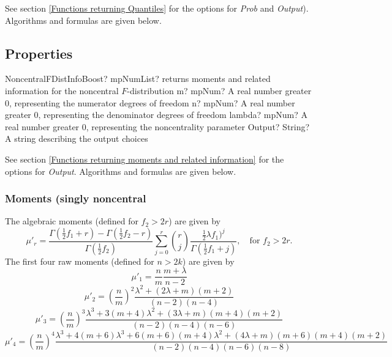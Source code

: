 See section \ref{Functions returning Quantiles} for the options for  {\itshape\sffamily Prob} and {\itshape\sffamily Output}). Algorithms and formulas are given below.




\subsection{Properties}


\begin{mpFunctionsExtract}
	\mpFunctionFour
	{NoncentralFDistInfoBoost? mpNumList? returns moments and related information for the noncentral $F$-distribution}
	{m? mpNum? A real number greater 0, representing the numerator  degrees of freedom}
	{n? mpNum? A real number greater 0, representing the denominator degrees of freedom}
	{lambda? mpNum? A real number greater 0, representing the noncentrality parameter}
	{Output? String? A string describing the output choices}
\end{mpFunctionsExtract}

\vspace{0.3cm}

See section \ref{Functions returning moments and related information} for the options for {\itshape\sffamily Output}. Algorithms and formulas are given below.


\subsubsection{Moments (singly noncentral}
The algebraic moments (defined for $f_2 > 2r$) are given by
\begin{equation}
	\mu'_r = \frac{\Gamma( \tfrac{1}{2}f_1+r)-\Gamma( \tfrac{1}{2}f_2-r)}{\Gamma( \tfrac{1}{2}f_2)} \sum_{j=0}^{r} { \binom{r}{j} \frac{\tfrac{1}{2}\lambda f_1)^j} {\Gamma( \tfrac{1}{2}f_1+j)} }, \quad \text{for } f_2 > 2r.
\end{equation}
The first four raw moments (defined for $n > 2k$) are given by 
\begin{equation*}
	\mu'_1 = \frac{n}{m} \frac{m+\lambda}{n-2}
\end{equation*}
\begin{equation*}
	\mu'_2 = \left(\frac{n}{m}\right)^2 \frac{\lambda^2+(2\lambda+m)(m+2)}{(n-2)(n-4)}
\end{equation*}
\begin{equation*}
	\mu'_3 = \left(\frac{n}{m}\right)^3 \frac{\lambda^3+3(m+4)\lambda^2+(3\lambda+m)(m+4)(m+2)}{(n-2)(n-4)(n-6)}
\end{equation*}
\begin{equation*}
	\mu'_4 = \left(\frac{n}{m}\right)^4 \frac{\lambda^3+4(m+6)\lambda^3+6(m+6)(m+4)\lambda^2+(4\lambda+m)(m+6)(m+4)(m+2)}{(n-2)(n-4)(n-6)(n-8)}
\end{equation*}




